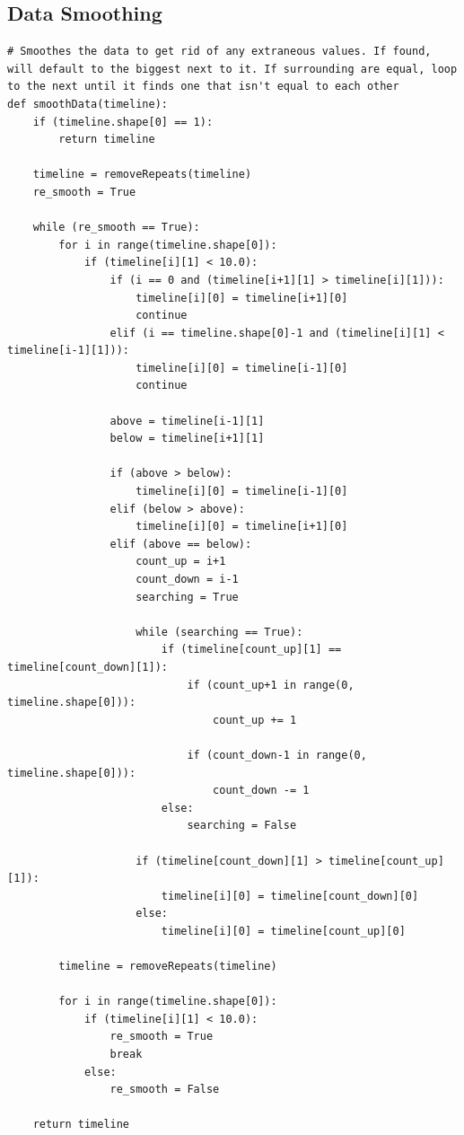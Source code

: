 \documentclass{article}
\begin{document}
\subsection{Data Smoothing}
\label{sec:data}
\begin{lstlisting}
# Smoothes the data to get rid of any extraneous values. If found, will default to the biggest next to it. If surrounding are equal, loop to the next until it finds one that isn't equal to each other
def smoothData(timeline):
	if (timeline.shape[0] == 1):
		return timeline

	timeline = removeRepeats(timeline)
	re_smooth = True

	while (re_smooth == True):
		for i in range(timeline.shape[0]):
			if (timeline[i][1] < 10.0):
				if (i == 0 and (timeline[i+1][1] > timeline[i][1])):
					timeline[i][0] = timeline[i+1][0]
					continue
				elif (i == timeline.shape[0]-1 and (timeline[i][1] < timeline[i-1][1])):
					timeline[i][0] = timeline[i-1][0]
					continue

				above = timeline[i-1][1]
				below = timeline[i+1][1]

				if (above > below):
					timeline[i][0] = timeline[i-1][0]
				elif (below > above):
					timeline[i][0] = timeline[i+1][0]
				elif (above == below):
					count_up = i+1
					count_down = i-1
					searching = True

					while (searching == True):
						if (timeline[count_up][1] == timeline[count_down][1]):
							if (count_up+1 in range(0, timeline.shape[0])):
								count_up += 1

							if (count_down-1 in range(0, timeline.shape[0])):
								count_down -= 1
						else:
							searching = False

					if (timeline[count_down][1] > timeline[count_up][1]):
						timeline[i][0] = timeline[count_down][0]
					else:
						timeline[i][0] = timeline[count_up][0]

		timeline = removeRepeats(timeline)

		for i in range(timeline.shape[0]):
			if (timeline[i][1] < 10.0):
				re_smooth = True
				break
			else:
				re_smooth = False

	return timeline
\end{lstlisting}
\end{document}
